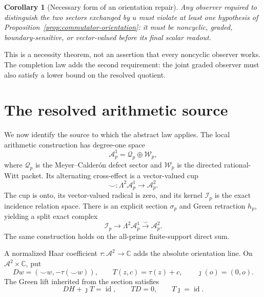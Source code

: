 \documentclass[11pt]{article}
\newtheorem{corollary}[theorem]{Corollary}
\theoremstyle{definition}
\theoremstyle{remark}
\newcommand{\C}{\mathbb C}
\newcommand{\cA}{\mathcal A}
\newcommand{\cI}{\mathcal I}
\newcommand{\cQ}{\mathcal Q}
\newcommand{\cW}{\mathcal W}
\newcommand{\id}{\operatorname{id}}
\begin{document}
\begin{corollary}[Necessary form of an orientation repair]
\label{cor:orientation-repair}
Any observer required to distinguish the two sectors exchanged by \(u\)
must violate at least one hypothesis of Proposition~\ref{prop:commutator-orientation}:
it must be noncyclic, graded, boundary-sensitive, or vector-valued before
its final scalar readout.
\end{corollary}

This is a necessity theorem, not an assertion that every noncyclic observer
works.  The completion law adds the second requirement: the joint graded
observer must also satisfy a lower bound on the resolved quotient.

\section{The resolved arithmetic source}
\label{sec:source}

We now identify the source to which the abstract law applies.  The local
arithmetic construction has degree-one space
\[
                  \cA_p^1=\cQ_p\oplus\cW_p,
\]
where \(\cQ_p\) is the Meyer--Calder\'on defect sector and \(\cW_p\) is the
directed rational-Witt packet.  Its alternating cross-effect is a
vector-valued cup
\[
            \smile:\Lambda^2\cA_p^1\longrightarrow\cA_p^2.
\tag{6.1}\label{eq:source-cup}
\]
The cup is onto, its vector-valued radical is zero, and its kernel
\(\cI_p\) is the exact incidence relation space.  There is an explicit
section \(\sigma_p\) and Green retraction \(h_p\), yielding a split exact
complex
\[
 \cI_p\longrightarrow\Lambda^2\cA_p^1
        \xrightarrow{\smile}\cA_p^2.
\tag{6.2}\label{eq:local-source-complex}
\]
The same construction holds on the all-prime finite-support direct sum.

A normalized Haar coefficient \(\tau:\cA^2\to\C\) adds the absolute
orientation line.  On \(\cA^2\times\C\), put
\[
 D w=(\smile w,-\tau(\smile w)),
 \qquad
 T(z,c)=\tau(z)+c,
 \qquad
 \jmath(o)=(0,o).
\tag{6.3}\label{eq:oriented-source}
\]
The Green lift inherited from the section satisfies
\[
                         DH+\jmath T=\id,
                         \qquad TD=0,
                         \qquad T\jmath=\id.
\tag{6.4}\label{eq:source-green}
\]
\end{document}
